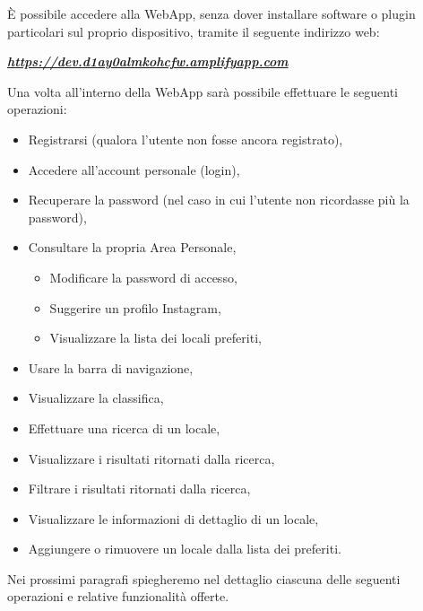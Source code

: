 
È possibile accedere alla WebApp, senza dover installare software o plugin particolari sul proprio dispositivo, tramite il seguente indirizzo web:

\begin{center}
\textsl{ \href{https://dev.d1ay0almkohcfw.amplifyapp.com}{\textbf{https://dev.d1ay0almkohcfw.amplifyapp.com} }}
\end{center}

Una volta all’interno della WebApp sarà possibile effettuare le seguenti operazioni:

\begin{itemize}
	\item Registrarsi (qualora l’utente non fosse ancora registrato),
	\item Accedere all'account personale (login),
	\item Recuperare la password (nel caso in cui l'utente non ricordasse più la password),
	\item Consultare la propria Area Personale,
	\begin{itemize}
	\item Modificare la password di accesso,
	\item Suggerire un profilo Instagram,
	\item Visualizzare la lista dei locali preferiti,
	\end{itemize}
	\item Usare la barra di navigazione,
	\item Visualizzare la classifica,
	\item Effettuare una ricerca di un locale,
	\item Visualizzare i risultati ritornati dalla ricerca,
	\item Filtrare i risultati ritornati dalla ricerca,
	\item Visualizzare le informazioni di dettaglio di un locale,
	\item Aggiungere o rimuovere un locale dalla lista dei preferiti.
\end{itemize}

Nei prossimi paragrafi spiegheremo nel dettaglio ciascuna delle seguenti operazioni e relative funzionalità offerte.
